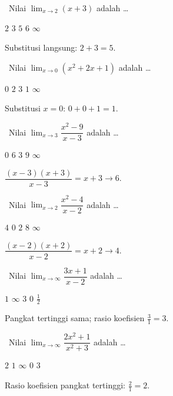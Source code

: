 \documentclass[11pt,a4paper]{exam}
\newcommand{\Fund}{{\footnotesize\textsf{\textcolor{hijau}{[Fundamental]}}}\ }
\newcommand{\Inter}{{\footnotesize\textsf{\textcolor{biru}{[Intermediate]}}}\ }
\begin{document}
\begin{questions}

\question \Fund Nilai $\displaystyle\lim_{x\to 2}(x+3)$ adalah \dots
\begin{choices}
\choice $2$ \choice $3$ \CorrectChoice $5$ \choice $6$ \choice $\infty$
\end{choices}
\begin{solution}Substitusi langsung: $2+3 = 5.$\end{solution}

\question \Fund Nilai $\displaystyle\lim_{x\to 0}(x^{2}+2x+1)$ adalah \dots
\begin{choices}
\choice $0$ \choice $2$ \choice $3$ \CorrectChoice $1$ \choice $\infty$
\end{choices}
\begin{solution}Substitusi $x=0$: $0+0+1 = 1.$\end{solution}

\question \Inter Nilai $\displaystyle\lim_{x\to 3}\dfrac{x^{2}-9}{x-3}$ adalah \dots
\begin{choices}
\choice $0$ \CorrectChoice $6$ \choice $3$ \choice $9$ \choice $\infty$
\end{choices}
\begin{solution}$\dfrac{(x-3)(x+3)}{x-3} = x+3 \to 6.$\end{solution}

\question \Inter Nilai $\displaystyle\lim_{x\to 2}\dfrac{x^{2}-4}{x-2}$ adalah \dots
\begin{choices}
\CorrectChoice $4$ \choice $0$ \choice $2$ \choice $8$ \choice $\infty$
\end{choices}
\begin{solution}$\dfrac{(x-2)(x+2)}{x-2} = x+2 \to 4.$\end{solution}

\question \Inter Nilai $\displaystyle\lim_{x\to\infty}\dfrac{3x+1}{x-2}$ adalah \dots
\begin{choices}
\choice $1$ \choice $\infty$ \CorrectChoice $3$ \choice $0$ \choice $\tfrac{1}{2}$
\end{choices}
\begin{solution}Pangkat tertinggi sama; rasio koefisien $\tfrac{3}{1} = 3.$\end{solution}

\question \Inter Nilai $\displaystyle\lim_{x\to\infty}\dfrac{2x^{2}+1}{x^{2}+3}$ adalah \dots
\begin{choices}
\CorrectChoice $2$ \choice $1$ \choice $\infty$ \choice $0$ \choice $3$
\end{choices}
\begin{solution}Rasio koefisien pangkat tertinggi: $\tfrac{2}{1} = 2.$\end{solution}


\end{questions}
\end{document}
